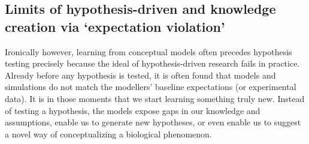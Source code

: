 \subsection{Limits of hypothesis-driven and knowledge creation via `expectation violation'}

Ironically however, learning from conceptual models often precedes hypothesis testing precisely because the  ideal of hypothesis-driven research fails in practice. Already before any hypothesis is tested, it is often found that models and simulations do not match the modellers’ baseline expectations (or experimental data). It is in those moments that we start learning something truly new. Instead of testing a hypothesis, the models expose gaps in our knowledge and assumptions, enable us to generate new hypotheses, or  even enable us to suggest a novel way of conceptualizing  a biological phenomenon. 
  
  